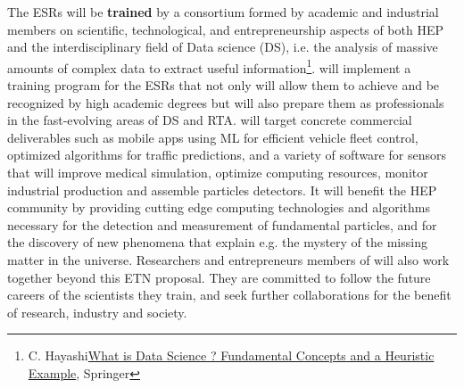 The \acronym ESRs will be \textbf{trained} by a consortium formed by academic and industrial members on scientific, technological, and entrepreneurship aspects of both HEP and the interdisciplinary field of Data science (DS), i.e. the analysis of massive amounts of complex data to extract useful information\footnote{C. Hayashi\href{https://link.springer.com/chapter/10.1007/978-4-431-65950-1_3}{What is Data Science ? Fundamental Concepts and a Heuristic Example}, Springer}. 
\acronym will implement a training program for the ESRs that not only will allow them to achieve and be recognized by high academic degrees but will also prepare them as professionals in the fast-evolving areas of DS and RTA.
\acronym will target concrete commercial deliverables such as 
mobile apps using ML for efficient vehicle fleet control, 
optimized algorithms for traffic predictions,
and a variety of software for sensors that will improve medical simulation,
optimize computing resources,
monitor industrial production
and assemble particles detectors. 
It will benefit the HEP community by providing cutting edge computing technologies and algorithms necessary for the detection and measurement of fundamental particles, and for the discovery of new phenomena that explain e.g. the mystery of the missing matter in the universe. 
Researchers and entrepreneurs members of \acronym will also work together beyond this ETN proposal.
They are committed to follow the future careers of the scientists they train, and seek further collaborations for the benefit of research, industry and society. 


